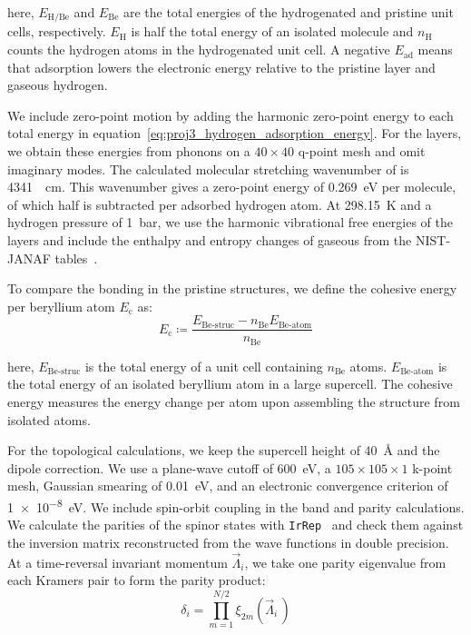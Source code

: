 here, $E_{\mathrm{H/Be}}$ and $E_{\mathrm{Be}}$ are the total energies of the hydrogenated and pristine unit cells, respectively.
$E_{\mathrm{H}}$ is half the total energy of an isolated  molecule and $n_{\mathrm{H}}$ counts the hydrogen atoms in the hydrogenated unit cell.
A negative $E_{\mathrm{ad}}$ means that adsorption lowers the electronic energy relative to the pristine layer and gaseous hydrogen.

We include zero-point motion by adding the harmonic zero-point energy to each total energy in equation~\eqref{eq:proj3_hydrogen_adsorption_energy}.
For the layers, we obtain these energies from phonons on a $40 \times 40$ q-point mesh and omit imaginary modes.
The calculated molecular stretching wavenumber of  is \qty{4341}{\per\centi\metre}.
This wavenumber gives a zero-point energy of \qty{0.269}{\electronvolt} per molecule, of which half is subtracted per adsorbed hydrogen atom.
At \qty{298.15}{\kelvin} and a hydrogen pressure of \qty{1}{\bar}, we use the harmonic vibrational free energies of the layers and include the enthalpy and entropy changes of gaseous  from the NIST-JANAF tables~\cite{chase1998nist}.

To compare the bonding in the pristine structures, we define the cohesive energy per beryllium atom $E_{\mathrm{c}}$ as:
\begin{equation}
    E_{\mathrm{c}} \coloneqq
    \frac{E_{\mathrm{Be\text{-}struc}}-n_{\mathrm{Be}}E_{\mathrm{Be\text{-}atom}}}{n_{\mathrm{Be}}}
\label{eq:proj3_cohesive_energy}
\end{equation}

here, $E_{\mathrm{Be\text{-}struc}}$ is the total energy of a unit cell containing $n_{\mathrm{Be}}$ atoms.
$E_{\mathrm{Be\text{-}atom}}$ is the total energy of an isolated beryllium atom in a large supercell.
The cohesive energy measures the energy change per atom upon assembling the structure from isolated atoms.

For the topological calculations, we keep the supercell height of \qty{40}{\angstrom} and the dipole correction.
We use a plane-wave cutoff of \qty{600}{\electronvolt}, a $105 \times 105 \times 1$ k-point mesh, Gaussian smearing of \qty{0.01}{\electronvolt}, and an electronic convergence criterion of \qty{1e-8}{\electronvolt}.
We include spin-orbit coupling in the band and parity calculations.
We calculate the parities of the spinor states with \texttt{IrRep}~\cite{iraola2022irrep} and check them against the inversion matrix reconstructed from the wave functions in double precision.
At a time-reversal invariant momentum $\vec{\Lambda}_i$, we take one parity eigenvalue from each Kramers pair to form the parity product:
\begin{equation}
    \delta_i =
    \prod_{m=1}^{N/2}
    \xi_{2m}(\vec{\Lambda}_i\,)
\label{eq:proj3_parity_product}
\end{equation}

